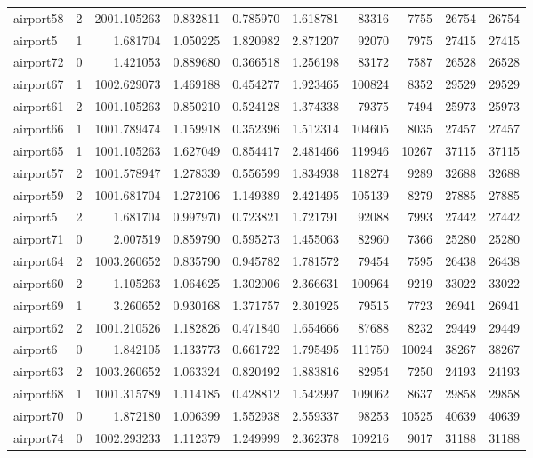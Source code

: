 \begin{longtable}{|l|r|r|r|r|r|r|r|r|r|}
airport58 & 2 & 2001.105263 & 0.832811 & 0.785970 & 1.618781 & 83316 & 7755 & 26754 & 26754 \\
airport5 & 1 & 1.681704 & 1.050225 & 1.820982 & 2.871207 & 92070 & 7975 & 27415 & 27415 \\
airport72 & 0 & 1.421053 & 0.889680 & 0.366518 & 1.256198 & 83172 & 7587 & 26528 & 26528 \\
airport67 & 1 & 1002.629073 & 1.469188 & 0.454277 & 1.923465 & 100824 & 8352 & 29529 & 29529 \\
airport61 & 2 & 1001.105263 & 0.850210 & 0.524128 & 1.374338 & 79375 & 7494 & 25973 & 25973 \\
airport66 & 1 & 1001.789474 & 1.159918 & 0.352396 & 1.512314 & 104605 & 8035 & 27457 & 27457 \\
airport65 & 1 & 1001.105263 & 1.627049 & 0.854417 & 2.481466 & 119946 & 10267 & 37115 & 37115 \\
airport57 & 2 & 1001.578947 & 1.278339 & 0.556599 & 1.834938 & 118274 & 9289 & 32688 & 32688 \\
airport59 & 2 & 1001.681704 & 1.272106 & 1.149389 & 2.421495 & 105139 & 8279 & 27885 & 27885 \\
airport5 & 2 & 1.681704 & 0.997970 & 0.723821 & 1.721791 & 92088 & 7993 & 27442 & 27442 \\
airport71 & 0 & 2.007519 & 0.859790 & 0.595273 & 1.455063 & 82960 & 7366 & 25280 & 25280 \\
airport64 & 2 & 1003.260652 & 0.835790 & 0.945782 & 1.781572 & 79454 & 7595 & 26438 & 26438 \\
airport60 & 2 & 1.105263 & 1.064625 & 1.302006 & 2.366631 & 100964 & 9219 & 33022 & 33022 \\
airport69 & 1 & 3.260652 & 0.930168 & 1.371757 & 2.301925 & 79515 & 7723 & 26941 & 26941 \\
airport62 & 2 & 1001.210526 & 1.182826 & 0.471840 & 1.654666 & 87688 & 8232 & 29449 & 29449 \\
airport6 & 0 & 1.842105 & 1.133773 & 0.661722 & 1.795495 & 111750 & 10024 & 38267 & 38267 \\
airport63 & 2 & 1003.260652 & 1.063324 & 0.820492 & 1.883816 & 82954 & 7250 & 24193 & 24193 \\
airport68 & 1 & 1001.315789 & 1.114185 & 0.428812 & 1.542997 & 109062 & 8637 & 29858 & 29858 \\
airport70 & 0 & 1.872180 & 1.006399 & 1.552938 & 2.559337 & 98253 & 10525 & 40639 & 40639 \\
airport74 & 0 & 1002.293233 & 1.112379 & 1.249999 & 2.362378 & 109216 & 9017 & 31188 & 31188 \\

\end{longtable}
